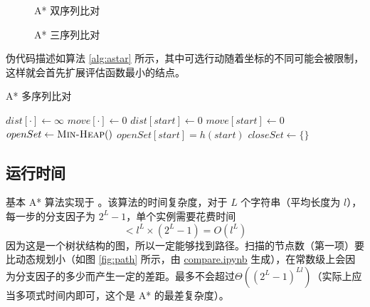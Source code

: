     \begin{figure}[h]
        \centering
        \begin{minipage}{0.48\textwidth}
            \centering
            
            \caption{A* 双序列比对}\label{fig:pairwiseastar}
        \end{minipage}
        \begin{minipage}{0.48\textwidth}
            \centering
            
            \caption{A* 三序列比对}\label{fig:multipleastar}
        \end{minipage}
    \end{figure}

    伪代码描述如算法 \ref{alg:astar} 所示\cite{astarwiki}，其中可选行动随着坐标的不同可能会被限制，这样就会首先扩展评估函数最小的结点。

    \begin{algorithm}[h]
        \caption{A* 多序列比对}\label{alg:astar}
        \BlankLine
        $dist[\cdot]\leftarrow\infty$\;
        $move[\cdot]\leftarrow 0$\;
        $dist[start]\leftarrow 0$\;
        $move[start]\leftarrow 0$\;
        $openSet\leftarrow\textsc{Min-Heap}()$\;
        $openSet[start]=h(start)$\;
        $closeSet\leftarrow \{\}$\;
        \Return{$\infty$}\;
    \end{algorithm}


    \subsection{运行时间}

    基本 A* 算法实现于 。该算法的时间复杂度，对于 $L$ 个字符串（平均长度为 $l$），每一步的分支因子为 $2^{L}-1$，单个实例需要花费时间
    \begin{equation}
     < l^L \times (2^L-1) = O(l^L)
    \end{equation}
    因为这是一个树状结构的图，所以一定能够找到路径。扫描的节点数（第一项）要比动态规划小（如图 \ref{fig:path} 所示，由 \href{./compare.ipynb}{\ttfamily compare.ipynb} 生成），在常数级上会因为分支因子的多少而产生一定的差距。最多不会超过$\Theta((2^L-1)^{Ll})$（实际上应当多项式时间内即可，这个是 A* 的最差复杂度）。


